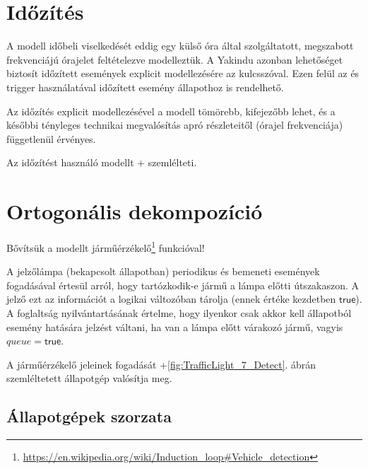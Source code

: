 \section{Időzítés}

A modell időbeli viselkedését eddig egy külső óra által szolgáltatott, megszabott frekvenciájú órajelet feltételezve modelleztük. A Yakindu azonban lehetőséget biztosít időzített események explicit modellezésére az  kulcsszóval. Ezen felül az  és  trigger használatával időzített esemény állapothoz is rendelhető.

Az időzítés explicit modellezésével a modell tömörebb, kifejezőbb lehet, és a későbbi tényleges technikai megvalósítás apró részleteitől (órajel frekvenciája) függetlenül érvényes.

Az időzítést használó modellt \az+ szemlélteti.


\section{Ortogonális dekompozíció}

Bővítsük a modellt járműérzékelő\footnote{\url{https://en.wikipedia.org/wiki/Induction\_loop\#Vehicle\_detection}} funkcióval!

\begin{tipp}
	A jelzőlámpa (bekapcsolt állapotban) periodikus  és  bemeneti események fogadásával értesül arról, hogy tartózkodik-e jármű a lámpa előtti útszakaszon. A jelző ezt az információt a  logikai változóban tárolja (ennek értéke kezdetben $\mathsf{true}$). A foglaltság nyilvántartásának értelme, hogy ilyenkor csak akkor kell  állapotból  esemény hatására jelzést váltani, ha van a lámpa előtt várakozó jármű, vagyis $\mathit{queue} = \mathsf{true}$.
\end{tipp}

A járműérzékelő jeleinek fogadását \az+\ref{fig:TrafficLight_7_Detect}. ábrán szemléltetett állapotgép valósítja meg.


\subsection{Állapotgépek szorzata}


